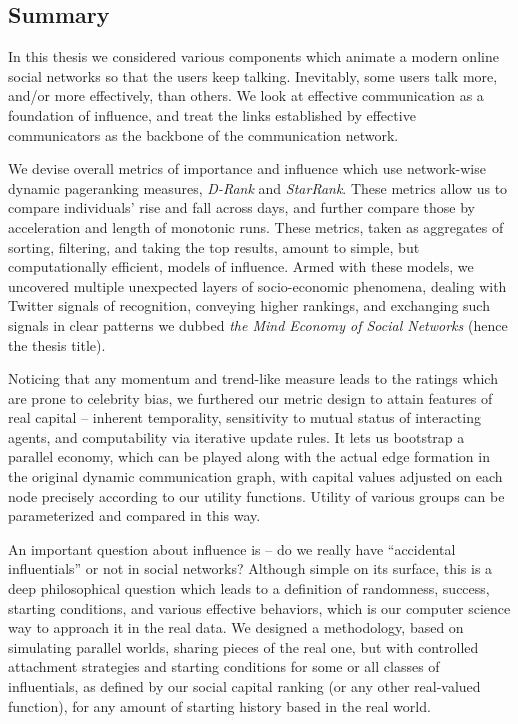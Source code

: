 \documentclass[10pt,oneside]{memoir}
\begin{document}
\begin{Spacing}{2}
\pagebreak \chapter{Summary}
\label{summary}

In this thesis we considered various components which animate a modern online social networks so that the users keep talking.  Inevitably, some users talk more, and/or more effectively, than others.  We look at effective communication as a foundation of influence, and treat the links established by effective communicators as the backbone of the communication network.  


We devise overall metrics of importance and influence which use network-wise dynamic pageranking measures, {\itshape D-Rank} and {\itshape StarRank}.  These metrics allow us to compare individuals' rise and fall across days, and further compare those by acceleration and length of monotonic runs.  These metrics, taken as aggregates of sorting, filtering, and taking the top results, amount to simple, but computationally efficient, models of influence.  Armed with these models, we uncovered multiple unexpected layers of socio-economic phenomena, dealing with Twitter signals of recognition, conveying higher rankings, and exchanging such signals in clear patterns we dubbed {\itshape the Mind Economy of Social Networks} (hence the thesis title).


Noticing that any momentum and trend-like measure leads to the ratings which are prone to celebrity bias, we furthered our metric design to attain features of real capital -- inherent temporality, sensitivity to mutual status of interacting agents, and computability via iterative update rules.  It lets us bootstrap a parallel economy, which can be played along with the actual edge formation in the original dynamic communication graph, with capital values adjusted on each node precisely according to our utility functions.  Utility of various groups can be parameterized and compared in this way.


An important question about influence is -- do we really have ``accidental influentials'' or not in social networks?  Although simple on its surface, this is a deep philosophical question which leads to a definition of randomness, success, starting conditions, and various effective behaviors, which is our computer science way to approach it in the real data.  We designed a methodology, based on simulating parallel worlds, sharing pieces of the real one, but with controlled attachment strategies and starting conditions for some or all classes of influentials, as defined by our social capital ranking (or any other real-valued function), for any amount of starting history based in the real world.  



\end{Spacing}
\end{document}
